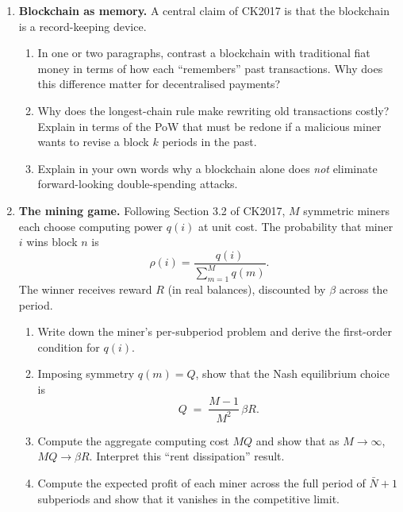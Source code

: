 \documentclass[11pt]{article}
\begin{document}
\begin{enumerate}

\item \textbf{Blockchain as memory.}
A central claim of CK2017 is that the blockchain is a record-keeping device.
\begin{enumerate}
    \item In one or two paragraphs, contrast a blockchain with traditional fiat money in terms
          of how each ``remembers'' past transactions. Why does this difference matter for
          decentralised payments?
    \item Why does the longest-chain rule make rewriting old transactions costly? Explain in terms
          of the PoW that must be redone if a malicious miner wants to revise a block $k$ periods
          in the past.
    \item Explain in your own words why a blockchain alone does \emph{not} eliminate
          forward-looking double-spending attacks.
\end{enumerate}

\item \textbf{The mining game.}
Following Section 3.2 of CK2017, $M$ symmetric miners each choose computing power $q(i)$ at unit cost.
The probability that miner $i$ wins block $n$ is
\[
    \rho(i) = \frac{q(i)}{\sum_{m=1}^M q(m)}.
\]
The winner receives reward $R$ (in real balances), discounted by $\beta$ across the period.
\begin{enumerate}
    \item Write down the miner's per-subperiod problem and derive the first-order condition for $q(i)$.
    \item Imposing symmetry $q(m)=Q$, show that the Nash equilibrium choice is
          \[
              Q \;=\; \frac{M-1}{M^2}\,\beta R.
          \]
    \item Compute the aggregate computing cost $MQ$ and show that as $M\to\infty$,
          $MQ \to \beta R$. Interpret this ``rent dissipation'' result.
    \item Compute the expected profit of each miner across the full period of $\bar N+1$
          subperiods and show that it vanishes in the competitive limit.
\end{enumerate}


\end{enumerate}
\end{document}
